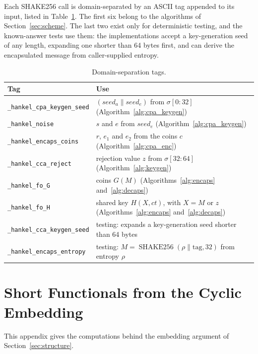 \documentclass[11pt,a4paper]{article}
\theoremstyle{definition}
\newcommand{\SHAKE}{\operatorname{SHAKE256}}
\begin{document}
Each SHAKE256 call is domain-separated by an ASCII tag appended to its input, listed in Table~\ref{tab:tags}. The first six belong to the algorithms of Section~\ref{sec:scheme}. The last two exist only for deterministic testing, and the known-answer tests use them: the implementations accept a key-generation seed of any length, expanding one shorter than 64 bytes first, and can derive the encapsulated message from caller-supplied entropy.

\begin{table}[H]
\centering
\small
\begin{tabularx}{\textwidth}{lX}
\toprule
Tag & Use \\
\midrule
\texttt{\_hankel\_cpa\_keygen\_seed} & $(\mathit{seed}_a \| \mathit{seed}_e)$ from $\sigma[0{:}32]$ (Algorithm~\ref{alg:cpa_keygen}) \\
\texttt{\_hankel\_noise} & $s$ and $e$ from $\mathit{seed}_e$ (Algorithm~\ref{alg:cpa_keygen}) \\
\texttt{\_hankel\_encaps\_coins} & $r$, $e_1$ and $e_2$ from the coins $c$ (Algorithm~\ref{alg:cpa_enc}) \\
\texttt{\_hankel\_cca\_reject} & rejection value $z$ from $\sigma[32{:}64]$ (Algorithm~\ref{alg:keygen}) \\
\texttt{\_hankel\_fo\_G} & coins $G(M)$ (Algorithms~\ref{alg:encaps} and~\ref{alg:decaps}) \\
\texttt{\_hankel\_fo\_H} & shared key $H(X, \mathit{ct})$, with $X = M$ or $z$ (Algorithms~\ref{alg:encaps} and~\ref{alg:decaps}) \\
\texttt{\_hankel\_cca\_keygen\_seed} & testing: expands a key-generation seed shorter than 64 bytes \\
\texttt{\_hankel\_encaps\_entropy} & testing: $M = \SHAKE(\rho \| \text{tag}, 32)$ from entropy $\rho$ \\
\bottomrule
\end{tabularx}
\caption{Domain-separation tags.}
\label{tab:tags}
\end{table}


\section{Short Functionals from the Cyclic Embedding}\label{app:functionals}
This appendix gives the computations behind the embedding argument of Section~\ref{sec:structure}.
\end{document}
